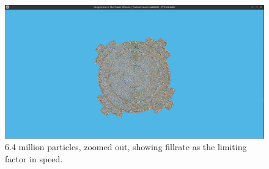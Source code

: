\documentclass[]{report}
\begin{document}
\begin{figure}
	\centering
	\centerline{\includegraphics[width=1.6\linewidth]{screenshot005}}
	\caption{6.4 million particles, zoomed out, showing fillrate as the limiting factor in speed.}
	\label{fig:phyiscsrendfill}
\end{figure}



\nocite{*}



\end{document}
